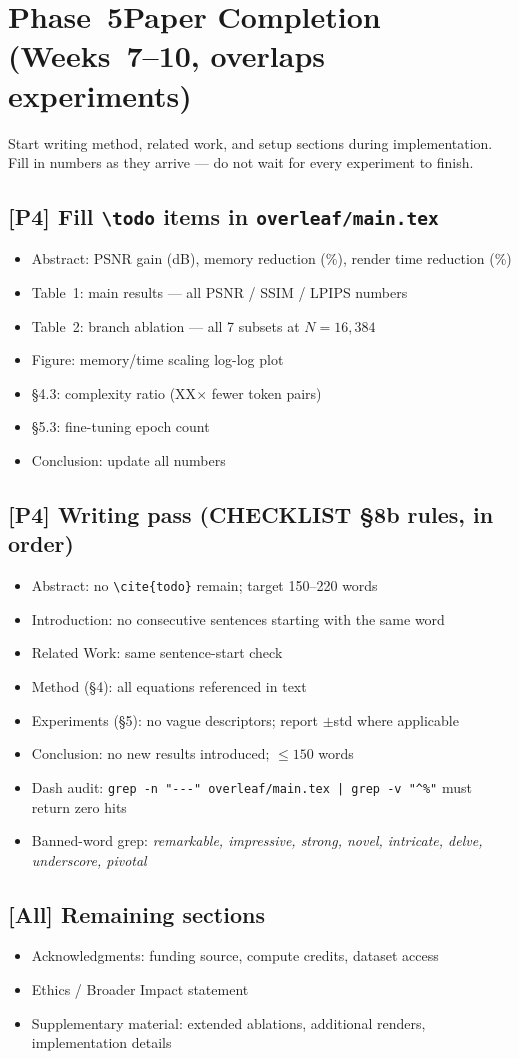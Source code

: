 \documentclass[11pt,a4paper]{article}
\newcommand{\role}[1]{\textbf{[#1]}}
\newcommand{\sq}{\item[$\square$]}
\begin{document}
\section{Phase~5\quad Paper Completion \textnormal{(Weeks~7--10, overlaps experiments)}}

Start writing method, related work, and setup sections during implementation.
Fill in numbers as they arrive --- do not wait for every experiment to finish.

\subsection{\role{P4} Fill \texttt{\textbackslash{}todo} items in \texttt{overleaf/main.tex}}
\begin{itemize}[leftmargin=1.8em, itemsep=2pt]
  \sq Abstract: PSNR gain (dB), memory reduction (\%), render time reduction (\%)
  \sq Table~1: main results --- all PSNR / SSIM / LPIPS numbers
  \sq Table~2: branch ablation --- all 7 subsets at $N = 16{,}384$
  \sq Figure: memory/time scaling log-log plot
  \sq \S4.3: complexity ratio (XX$\times$ fewer token pairs)
  \sq \S5.3: fine-tuning epoch count
  \sq Conclusion: update all numbers
\end{itemize}

\subsection{\role{P4} Writing pass (CHECKLIST \S8b rules, in order)}
\begin{itemize}[leftmargin=1.8em, itemsep=2pt]
  \sq Abstract: no \texttt{\textbackslash{}cite\{todo\}} remain; target 150--220 words
  \sq Introduction: no consecutive sentences starting with the same word
  \sq Related Work: same sentence-start check
  \sq Method (\S4): all equations referenced in text
  \sq Experiments (\S5): no vague descriptors; report $\pm$std where applicable
  \sq Conclusion: no new results introduced; $\leq 150$ words
  \sq Dash audit:
      \texttt{grep -n "{-}{-}{-}" overleaf/main.tex | grep -v "\^{}\%"} must return zero hits
  \sq Banned-word grep: \emph{remarkable, impressive, strong, novel, intricate,
      delve, underscore, pivotal}
\end{itemize}

\subsection{\role{All} Remaining sections}
\begin{itemize}[leftmargin=1.8em, itemsep=2pt]
  \sq Acknowledgments: funding source, compute credits, dataset access
  \sq Ethics / Broader Impact statement
  \sq Supplementary material: extended ablations, additional renders, implementation details
\end{itemize}
\end{document}

